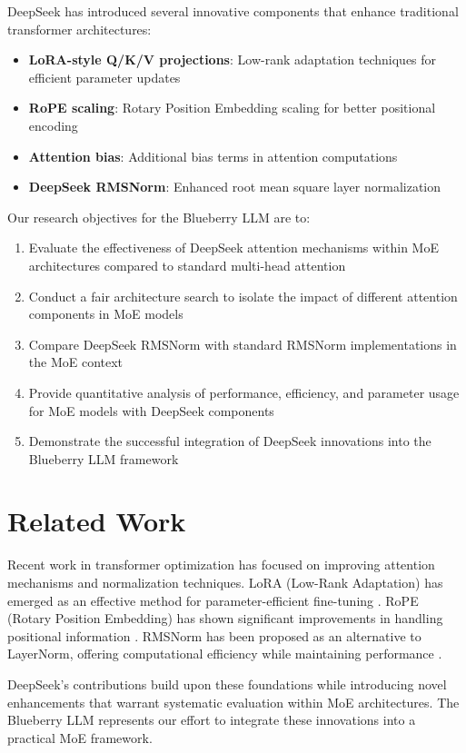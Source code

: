 \documentclass[11pt,a4paper]{article}
\begin{document}
DeepSeek has introduced several innovative components that enhance traditional transformer architectures:
\begin{itemize}
    \item \textbf{LoRA-style Q/K/V projections}: Low-rank adaptation techniques for efficient parameter updates
    \item \textbf{RoPE scaling}: Rotary Position Embedding scaling for better positional encoding
    \item \textbf{Attention bias}: Additional bias terms in attention computations
    \item \textbf{DeepSeek RMSNorm}: Enhanced root mean square layer normalization
\end{itemize}

Our research objectives for the Blueberry LLM are to:
\begin{enumerate}
    \item Evaluate the effectiveness of DeepSeek attention mechanisms within MoE architectures compared to standard multi-head attention
    \item Conduct a fair architecture search to isolate the impact of different attention components in MoE models
    \item Compare DeepSeek RMSNorm with standard RMSNorm implementations in the MoE context
    \item Provide quantitative analysis of performance, efficiency, and parameter usage for MoE models with DeepSeek components
    \item Demonstrate the successful integration of DeepSeek innovations into the Blueberry LLM framework
\end{enumerate}

\section{Related Work}

Recent work in transformer optimization has focused on improving attention mechanisms and normalization techniques. LoRA (Low-Rank Adaptation) has emerged as an effective method for parameter-efficient fine-tuning \cite{hu2021lora}. RoPE (Rotary Position Embedding) has shown significant improvements in handling positional information \cite{su2021roformer}. RMSNorm has been proposed as an alternative to LayerNorm, offering computational efficiency while maintaining performance \cite{zhang2019root}.

DeepSeek's contributions build upon these foundations while introducing novel enhancements that warrant systematic evaluation within MoE architectures. The Blueberry LLM represents our effort to integrate these innovations into a practical MoE framework.
\end{document}
